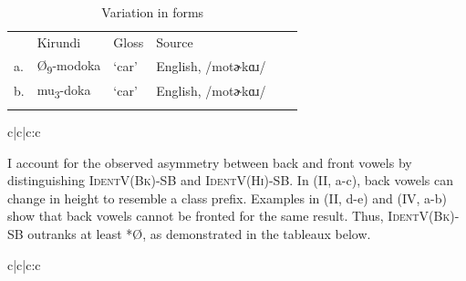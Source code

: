 \documentclass[output=paper,colorlinks,citecolor=brown,
]{langscibook}
\begin{document}
\begin{table}
\caption{Variation in forms}
\label{tab:kinchsular:variation}
\begin{tabular}{llllll}
  \lsptoprule
        & {Kirundi} & {Gloss} & {Source} \\
         a. & {Ø}\textsubscript{9}-modoka & `car' & English, /motɚkɑɹ/ \\
         b. & mu\textsubscript{3}-doka & `car' & English, /motɚkɑɹ/ \\
  \lspbottomrule
\end{tabular}
\end{table}

\begin{table}
\ShadingOn
  \caption{Evaluation of /motɚkɑɹ/}
  \label{tab:kinchsular:motorcartableau}
  
\begin{tableau}{c|c|c:c} 
 
 
 \vio{} \vio{} \vio{} \vio{*} 
 \vio{} \vio{} \vio{*} \vio{} 
 \vio{} \vio{*!} \vio{} \vio{} 
\vio{*!} \vio{} \vio{} \vio{} 
\end{tableau}
\end{table}

I account for the observed asymmetry between back and front vowels by distinguishing \textsc{IdentV(Bk)}-SB and \textsc{IdentV(Hi)}-SB. In  (\textsc{II}, a-c), back vowels can change in height to resemble a class prefix. Examples in  (\textsc{II}, d-e) and  (\textsc{IV}, a-b) show that back vowels cannot be fronted for the same result. Thus, \textsc{IdentV(Bk)}-SB outranks at least *{Ø}, as demonstrated in the tableaux below.

\begin{table}
\ShadingOn
  \caption{Evaluation of /kurʒɛt/}
  \label{tab:kinchsular:zucchinitableau}
  
\begin{tableau}{c|c|c:c} 
 
 
 \vio{} \vio{} \vio{*} \vio{} 
 \vio{} \vio{*!} \vio{} \vio{} 
\end{tableau}
\end{table}
\end{document}
